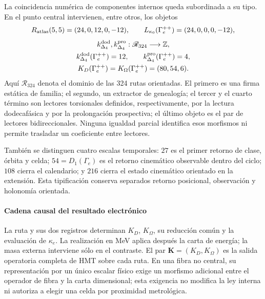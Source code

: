 La coincidencia numérica de componentes internos queda subordinada a su
tipo. En el punto central intervienen, entre otros, los objetos
\[
 R_{\rm atlas}(5,5)=(24,0,12,0,-12),
 \qquad
 L_{\kappa_0}(\Gamma_e^{++})=(24,0,0,0,-12),
\]
\[
 \begin{gathered}
 k_{\Delta_4}^{\rm dod},k_{\Delta_4}^{\rm pro}:
 \mathscr R_{324}\longrightarrow\mathbb Z,\\
 k_{\Delta_4}^{\rm dod}(\Gamma_e^{++})=12,
 \qquad
 k_{\Delta_4}^{\rm pro}(\Gamma_e^{++})=4,\\
 K_D(\Gamma_e^{++})=K_\Omega(\Gamma_e^{++})=(80,54,6).
 \end{gathered}
\]
Aquí \(\mathscr R_{324}\) denota el dominio de las 324 rutas orientadas.
El primero es una firma estática de familia; el segundo, un extractor de
genealogía; el tercer y el cuarto término son lectores torsionales definidos,
respectivamente, por la lectura dodecafásica y por la prolongación prospectiva;
el último objeto es el par de lectores bidireccionales. Ninguna igualdad
parcial identifica esos morfismos ni permite trasladar un coeficiente entre
lectores.

También se distinguen cuatro escalas temporales: \(27\) es el primer retorno
de clase, órbita y celda; \(54=D_1(\Gamma_e)\) es el retorno cinemático
observable dentro del ciclo; \(108\) cierra el calendario; y \(216\) cierra el estado cinemático
orientado en la extensión. Esta tipificación conserva separados retorno
posicional, observación y holonomía orientada.

\paragraph{Cadena causal del resultado electrónico}
La ruta y sus dos registros determinan \(K_D\), \(K_\Omega\), su reducción
común y la evaluación de \(\kappa_e\). La realización en MeV aplica después
la carta de energía; la masa externa interviene sólo en el contraste. El par
\(\mathbf K=(K_D,K_\Omega)\) es la salida operatoria completa de HMT sobre
cada ruta. En una fibra no central, su representación por un único escalar
físico exige un morfismo adicional entre el operador de fibra y la carta
dimensional; esta exigencia no modifica la ley interna ni autoriza a elegir
una celda por proximidad metrológica.
